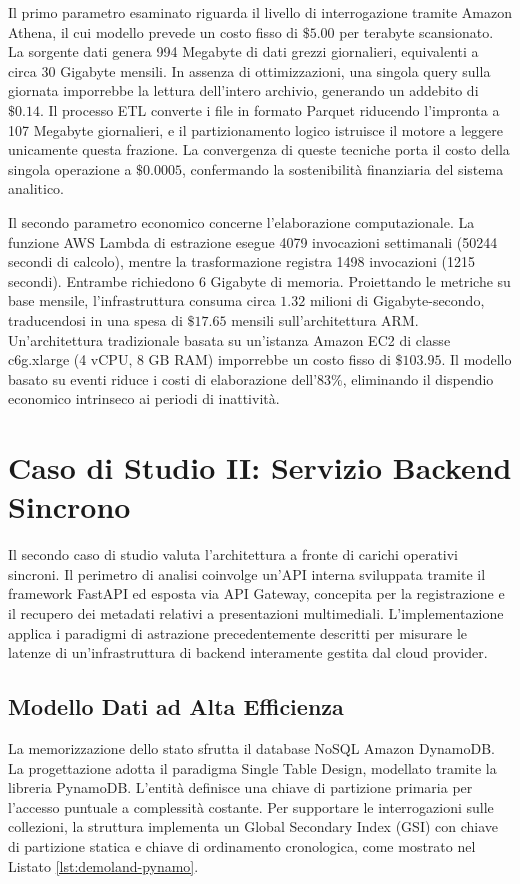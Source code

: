 Il primo parametro esaminato riguarda il livello di interrogazione tramite Amazon Athena, il cui modello prevede un costo fisso di $\$5.00$ per terabyte scansionato. La sorgente dati genera 994 Megabyte di dati grezzi giornalieri, equivalenti a circa 30 Gigabyte mensili. In assenza di ottimizzazioni, una singola query sulla giornata imporrebbe la lettura dell'intero archivio, generando un addebito di $\$0.14$. Il processo ETL converte i file in formato Parquet riducendo l'impronta a 107 Megabyte giornalieri, e il partizionamento logico istruisce il motore a leggere unicamente questa frazione. La convergenza di queste tecniche porta il costo della singola operazione a $\$0.0005$, confermando la sostenibilità finanziaria del sistema analitico.

Il secondo parametro economico concerne l'elaborazione computazionale. La funzione AWS Lambda di estrazione esegue 4079 invocazioni settimanali (50244 secondi di calcolo), mentre la trasformazione registra 1498 invocazioni (1215 secondi). Entrambe richiedono 6 Gigabyte di memoria. Proiettando le metriche su base mensile, l'infrastruttura consuma circa $1.32$ milioni di Gigabyte-secondo, traducendosi in una spesa di $\$17.65$ mensili sull'architettura ARM. Un'architettura tradizionale basata su un'istanza Amazon EC2 \cite{EC2} di classe c6g.xlarge (4 vCPU, 8 GB RAM) imporrebbe un costo fisso di $\$103.95$. Il modello basato su eventi riduce i costi di elaborazione dell'$83\%$, eliminando il dispendio economico intrinseco ai periodi di inattività.

\section{Caso di Studio II: Servizio Backend Sincrono}
Il secondo caso di studio valuta l'architettura a fronte di carichi operativi sincroni. Il perimetro di analisi coinvolge un'API interna sviluppata tramite il framework FastAPI ed esposta via API Gateway, concepita per la registrazione e il recupero dei metadati relativi a presentazioni multimediali. L'implementazione applica i paradigmi di astrazione precedentemente descritti per misurare le latenze di un'infrastruttura di backend interamente gestita dal cloud provider.

\subsection{Modello Dati ad Alta Efficienza}
La memorizzazione dello stato sfrutta il database NoSQL Amazon DynamoDB. La progettazione adotta il paradigma Single Table Design, modellato tramite la libreria PynamoDB. L'entità definisce una chiave di partizione primaria per l'accesso puntuale a complessità costante. Per supportare le interrogazioni sulle collezioni, la struttura implementa un Global Secondary Index (GSI) con chiave di partizione statica e chiave di ordinamento cronologica, come mostrato nel Listato \ref{lst:demoland-pynamo}.

